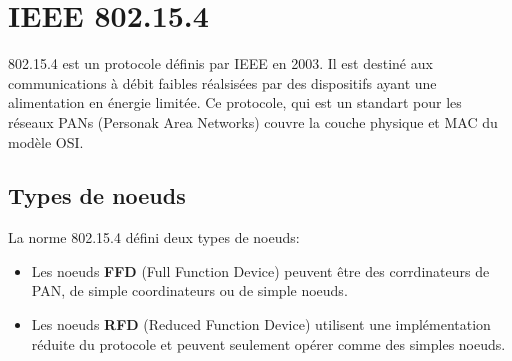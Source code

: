 \section{IEEE 802.15.4}\label{sec:etat_art-802.15.4}
\renewcommand{\rightmark}{IEEE 802.15.4}

  802.15.4 est un protocole définis par IEEE en 2003. Il est destiné aux
  communications à débit faibles réalsisées par des dispositifs ayant une
  alimentation en énergie limitée.
  Ce protocole, qui est un standart pour les réseaux PANs (Personak Area
  Networks) couvre la couche physique et MAC du modèle OSI.

\subsection{Types de noeuds}\label{subsec:etat_art-802.15.4.nodes}
  La norme 802.15.4 défini deux types de noeuds:
  \begin{itemize}[label=\textbullet]
    \item Les noeuds \textbf{FFD} (Full Function Device) peuvent être des corrdinateurs de PAN, de simple
          coordinateurs ou de simple noeuds.
    \item Les noeuds \textbf{RFD} (Reduced Function Device) utilisent une implémentation réduite du protocole
    et peuvent seulement opérer comme des simples noeuds.  
  \end{itemize}


